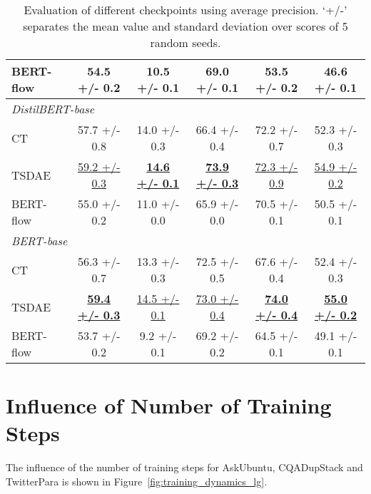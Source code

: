 \documentclass[11pt,a4paper]{article}
\begin{document}
\begin{table}
{\begin{tabular}{|l|c|c|c|c|c|}
BERT-flow & 54.5 +/- 0.2                  & 10.5 +/- 0.1                  & 69.0 +/- 0.1                  & 53.5 +/- 0.2                  & 46.6 +/- 0.1                   \\ 
\hline
\multicolumn{6}{|l|}{ \textit{DistilBERT-base} }                                                                                                                           \\ 
\hline
CT        & 57.7 +/- 0.8                  & 14.0 +/- 0.3                  & 66.4 +/- 0.4                  & 72.2 +/- 0.7                  & 52.3 +/- 0.3                   \\
TSDAE     & \uline{59.2 +/- 0.3}          & \uline{\textbf{14.6 +/- 0.1}} & \uline{\textbf{73.9 +/- 0.3}} & \uline{72.3 +/- 0.9}          & \uline{54.9 +/- 0.2}           \\
BERT-flow & 55.0 +/- 0.2                  & 11.0 +/- 0.0                  & 65.9 +/- 0.0                  & 70.5 +/- 0.1                  & 50.5 +/- 0.1                   \\ 
\hline
\multicolumn{6}{|l|}{ \textit{BERT-base} }                                                                                                                                 \\ 
\hline
CT        & 56.3 +/- 0.7                  & 13.3 +/- 0.3                  & 72.5 +/- 0.5                  & 67.6 +/- 0.4                  & 52.4 +/- 0.3                   \\
TSDAE     & \uline{\textbf{59.4 +/- 0.3}} & \uline{14.5 +/- 0.1}          & \uline{73.0 +/- 0.4}          & \uline{\textbf{74.0 +/- 0.4}} & \uline{\textbf{55.0 +/- 0.2}}  \\
BERT-flow & 53.7 +/- 0.2                  & 9.2 +/- 0.1                   & 69.2 +/- 0.2                  & 64.5 +/- 0.1                  & 49.1 +/- 0.1                   \\
\hline
\end{tabular}}
\caption{Evaluation of different checkpoints using average precision. `+/-' separates the mean value and standard deviation over scores of 5 random seeds.}
\label{tbl:other_checkpoints}
\end{table}

\section{Influence of Number of Training Steps}
\label{sec:training_dynamics}
The influence of the number of training steps for AskUbuntu, CQADupStack and TwitterPara is shown in Figure~\ref{fig:training_dynamics_lg}.
\end{document}
